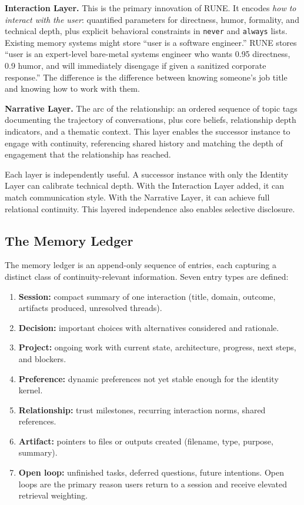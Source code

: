 \documentclass[11pt,a4paper]{article}
\begin{document}
\textbf{Interaction Layer.} This is the primary innovation of RUNE. It encodes \textit{how to interact with the user}: quantified parameters for directness, humor, formality, and technical depth, plus explicit behavioral constraints in \texttt{never} and \texttt{always} lists. Existing memory systems might store ``user is a software engineer.'' RUNE stores ``user is an expert-level bare-metal systems engineer who wants 0.95 directness, 0.9 humor, and will immediately disengage if given a sanitized corporate response.'' The difference is the difference between knowing someone's job title and knowing how to work with them.

\textbf{Narrative Layer.} The arc of the relationship: an ordered sequence of topic tags documenting the trajectory of conversations, plus core beliefs, relationship depth indicators, and a thematic context. This layer enables the successor instance to engage with continuity, referencing shared history and matching the depth of engagement that the relationship has reached.

Each layer is independently useful. A successor instance with only the Identity Layer can calibrate technical depth. With the Interaction Layer added, it can match communication style. With the Narrative Layer, it can achieve full relational continuity. This layered independence also enables selective disclosure.

\subsection{The Memory Ledger}

The memory ledger is an append-only sequence of entries, each capturing a distinct class of continuity-relevant information. Seven entry types are defined:

\begin{enumerate}
    \item \textbf{Session:} compact summary of one interaction (title, domain, outcome, artifacts produced, unresolved threads).
    \item \textbf{Decision:} important choices with alternatives considered and rationale.
    \item \textbf{Project:} ongoing work with current state, architecture, progress, next steps, and blockers.
    \item \textbf{Preference:} dynamic preferences not yet stable enough for the identity kernel.
    \item \textbf{Relationship:} trust milestones, recurring interaction norms, shared references.
    \item \textbf{Artifact:} pointers to files or outputs created (filename, type, purpose, summary).
    \item \textbf{Open loop:} unfinished tasks, deferred questions, future intentions. Open loops are the primary reason users return to a session and receive elevated retrieval weighting.
\end{enumerate}
\end{document}
